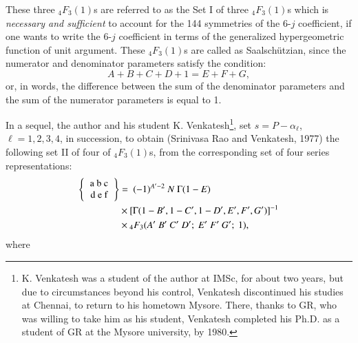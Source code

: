These three ${}_4F_3(1)$s are referred to as the Set I of three ${}_4F_3(1)$s which is \textit{necessary and sufficient} to account for the 144 symmetries of the 6-$j$ coefficient, if one wants to write the 6-$j$ coefficient in terms of the generalized hypergeometric function of unit argument. These ${}_4F_3(1)$s are called as Saalschützian, since the numerator and denominator parameters satisfy the condition:
\begin{equation}
A+B+C+D+1 = E+F+G, \label{chap7-eq36}
\end{equation}
or, in words, the difference between the sum of the denominator parameters and the sum of the numerator parameters is equal to 1.

In a sequel, the author and his student K. Venkatesh\footnote{K. Venkatesh was a student of the author at IMSc, for about two years, but due to circumstances beyond his control, Venkatesh discontinued his studies at Chennai, to return to his hometown Mysore. There, thanks to GR, who was willing to take him as his student, Venkatesh completed his Ph.D. as a student of GR at the Mysore university, by 1980.}, set $s = P-\alpha_\ell$, $\ell=1,2,3,4$, in succession, to obtain (Srinivasa Rao and Venkatesh, 1977) the following set II of four of $_4F_3(1)$s, from the corresponding set of four series representations:
\begin{equation}
\begin{split}
\left\{
\begin{tabular} {c} 
a\ b\ c\\ 
d\ e\ f \\ 
\end{tabular} 
\right\}
& = \ (-1)^{A'-2}\ N\ \Gamma(1-E)\\
& \times [\Gamma(1-B', 1-C', 1-D', E', F', G')]^{-1}\\
& \times {}_4F_3(A'\ B'\ C'\ D';\ E'\ F'\ G';\ 1), \label{chap7-eq37}
\end{split}
\end{equation}
where
